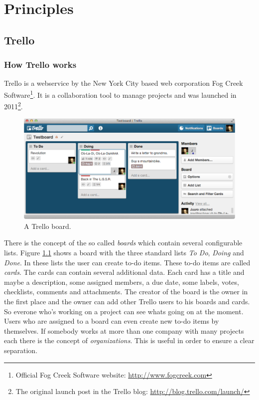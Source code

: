 \onehalfspacing
\chapter{Principles}
  \label{Principles}

\section{Trello}

\subsection{How Trello works}
Trello is a webservice by the New York City based web corporation Fog Creek Software\footnote{Official Fog Creek Software website: \url{http://www.fogcreek.com}}. It is a collaboration tool to manage projects and was launched in 2011\footnote{The original launch post in the Trello blog: \url{http://blog.trello.com/launch/}}. 

\begin{figure}[htb]
\centering
\includegraphics[width=\textwidth]{figures/trello}
\caption{A Trello board.}
\label{fig:trello}
\end{figure}

There is the concept of the so called \emph{boards} which contain several configurable lists. Figure \ref{fig:trello} shows a board with the three standard lists \emph{To Do}, \emph{Doing} and \emph{Done}. In these lists the user can create to-do items. These to-do items are called \emph{cards}. The cards can contain several additional data. Each card has a title and maybe a description, some assigned members, a due date, some labels, votes, checklists, comments and attachments. The creator of the board is the owner in the first place and the owner can add other Trello users to his boards and cards. So everone who's working on a project can see whats going on at the moment. Users who are assigned to a board can even create new to-do items by themselves. If somebody works at more than one company with many projects each there is the concept of \emph{organizations}. This is useful in order to ensure a clear separation.

